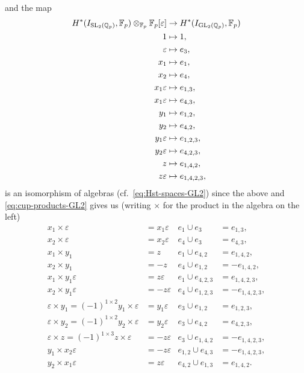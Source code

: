 \begin{remark}
\begin{align*}
  \end{align*}
  and the map
  \begin{align*}
    H^{*}(I_{\operatorname{SL}_{2}(\mathbb{Q}_{p})},\mathbb{F}_{p}) \otimes_{\mathbb{F}_{p}} \mathbb{F}_{p}[\varepsilon] &\to H^{*}(I_{\operatorname{GL}_{2}(\mathbb{Q}_{p})},\mathbb{F}_{p}) \\
    1 &\mapsto 1, \\
    \varepsilon &\mapsto e_{3}, \\
    x_{1} &\mapsto e_{1}, \\
    x_{2} &\mapsto e_{4}, \\
    x_{1}\varepsilon &\mapsto e_{1,3}, \\
    x_{1}\varepsilon &\mapsto e_{4,3}, \\
    y_{1} &\mapsto e_{1,2}, \\
    y_{2} &\mapsto e_{4,2}, \\
    y_{1}\varepsilon &\mapsto e_{1,2,3}, \\
    y_{2}\varepsilon &\mapsto e_{4,2,3}, \\
    z &\mapsto e_{1,4,2}, \\
    z\varepsilon &\mapsto e_{1,4,2,3},
  \end{align*}
  is an isomorphism of algebras (cf.\ \eqref{eq:Hst-spaces-GL2}) since the above and \eqref{eq:cup-products-GL2} gives us (writing $\times$ for the product in the algebra on the left)
  \begin{align*}
    x_{1} \times \varepsilon &= x_{1}\varepsilon & e_{1} \cup e_{3} &= e_{1,3}, \\
    x_{2} \times \varepsilon &= x_{2}\varepsilon & e_{4} \cup e_{3} &= e_{4,3}, \\
    x_{1} \times y_{1} &= z & e_{1} \cup e_{4,2} &= e_{1,4,2}, \\
    x_{2} \times y_{1} &= -z & e_{4} \cup e_{1,2} &= -e_{1,4,2}, \\
    x_{1} \times y_{1}\varepsilon &= z\varepsilon & e_{1} \cup e_{4,2,3} &= e_{1,4,2,3}, \\
    x_{2} \times y_{1}\varepsilon &= -z\varepsilon & e_{4} \cup e_{1,2,3} &= -e_{1,4,2,3}, \\
    \varepsilon \times y_{1} = (-1)^{1\times2} y_{1} \times \varepsilon &= y_{1}\varepsilon & e_{3} \cup e_{1,2} &= e_{1,2,3}, \\
    \varepsilon \times y_{2} = (-1)^{1\times2} y_{2} \times \varepsilon &= y_{2}\varepsilon & e_{3} \cup e_{4,2} &= e_{4,2,3}, \\
    \varepsilon \times z = (-1)^{1\times3} z \times \varepsilon &= -z\varepsilon & e_{3} \cup e_{1,4,2} &= -e_{1,4,2,3}, \\
    y_{1} \times x_{2}\varepsilon &= -z\varepsilon & e_{1,2} \cup e_{4,3} &= -e_{1,4,2,3}, \\
    y_{2} \times x_{1}\varepsilon &= z\varepsilon & e_{4,2} \cup e_{1,3} &= e_{1,4,2}.
  \end{align*}
\end{remark}

